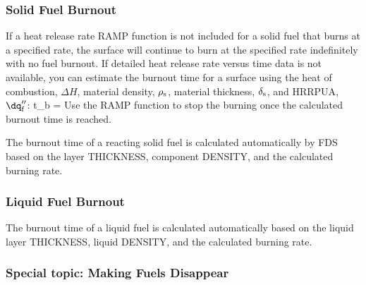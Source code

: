 \documentclass[11pt]{book}
\begin{document}
\subsubsection{Solid Fuel Burnout}

If a heat release rate {\ct RAMP} function is not included for a solid fuel that burns at a specified rate, the surface will continue to burn at the specified rate indefinitely with no fuel burnout.  If detailed heat release rate versus time data is not available, you can estimate the burnout time for a surface using the heat of combustion, $\Delta H$, material density, $\rho_{\rm s}$, material thickness, $\delta_{\rm s}$, and {\ct HRRPUA}, $\dq_{\rm f}''$:
\be
   t_{\rm b} = 
\ee
Use the {\ct RAMP} function to stop the burning once the calculated burnout time is reached.

The burnout time of a reacting solid fuel is calculated automatically by FDS based on the layer {\ct THICKNESS}, component {\ct DENSITY}, and the calculated burning rate.


\subsubsection{Liquid Fuel Burnout}

The burnout time of a liquid fuel is calculated automatically based on the liquid layer {\ct THICKNESS}, liquid {\ct DENSITY}, and the calculated burning rate.


\subsubsection{Special topic: Making Fuels Disappear}
\label{info:BURN_AWAY}
\end{document}
